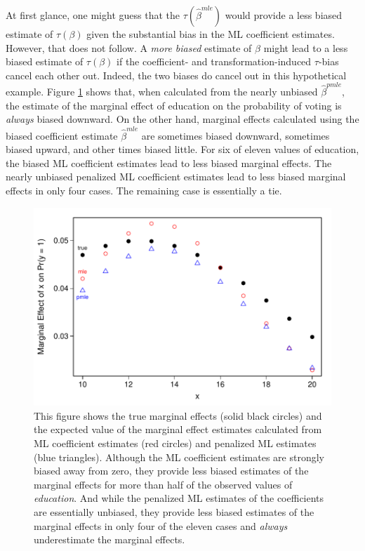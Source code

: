 \documentclass[12pt]{article}
\begin{document}
At first glance, one might guess that the $\tau(\hat{\beta}^{mle})$ would provide a less biased estimate of $\tau(\beta)$ given the substantial bias in the ML coefficient estimates. 
However, that does not follow. 
A \textit{more biased} estimate of $\beta$ might lead to a less biased estimate of $\tau(\beta)$ if the coefficient- and transformation-induced $\tau$-bias cancel each other out. 
Indeed, the two biases do cancel out in this hypothetical example. 
Figure \ref{fig:logit-me-bias} shows that, when calculated from the nearly unbiased $\hat{\beta}^{pmle}$, the estimate of the marginal effect of education on the probability of voting is \textit{always} biased downward. 
On the other hand, marginal effects calculated using the biased coefficient estimate $\hat{\beta}^{mle}$ are sometimes biased downward, sometimes biased upward, and other times biased little. 
For six of eleven values of education, the biased ML coefficient estimates lead to less biased marginal effects. 
The nearly unbiased penalized ML coefficient estimates lead to less biased marginal effects in only four cases. 
The remaining case is essentially a tie.

\begin{figure}[h!]
\begin{center}
\includegraphics[scale = 0.7]{figs/logit-me-bias.pdf}
\caption{This figure shows the true marginal effects (solid black circles) and the expected value of the marginal effect estimates calculated from ML coefficient estimates (red circles) and penalized ML estimates (blue triangles). 
Although the ML coefficient estimates are strongly biased away from zero, they provide less biased estimates of the marginal effects for more than half of the observed values of \textit{education}. 
And while the penalized ML estimates of the coefficients are essentially unbiased, they provide less biased estimates of the marginal effects in only four of the eleven cases and \textit{always} underestimate the marginal effects.}\label{fig:logit-me-bias}
\end{center}
\end{figure}
\end{document}
